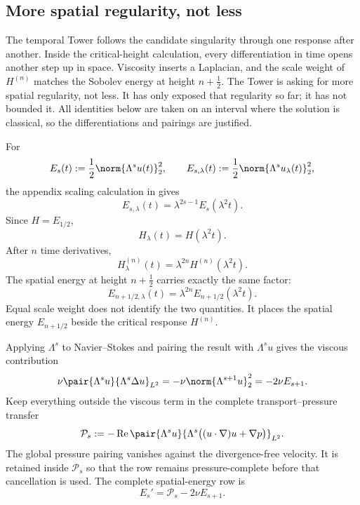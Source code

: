 \subsection{More spatial regularity, not less}\label{sub:ThePressureCompleteMixedDerivativeTower}

The temporal Tower follows the candidate singularity through one response after another.
Inside the critical-height calculation, every differentiation in time opens another step up in space.
Viscosity inserts a Laplacian, and the scale weight of \(H^{(n)}\) matches the Sobolev energy at height \(n+\tfrac12\).
The Tower is asking for more spatial regularity, not less.
It has only exposed that regularity so far; it has not bounded it.
All identities below are taken on an interval where the solution is classical, so the differentiations and pairings are justified.

For
\[
  E_s(t):=\frac12\norm{\Lambda^su(t)}_2^2,
  \qquad
  E_{s,\lambda}(t):=\frac12\norm{\Lambda^su_\lambda(t)}_2^2,
\]
the appendix scaling calculation in  gives
\begin{equation}\label{eq:BodySpatialEnergyScaling}
  E_{s,\lambda}(t)
  =\lambda^{2s-1}E_s(\lambda^2t).
\end{equation}
Since \(H=E_{1/2}\),
\[
  H_\lambda(t)=H(\lambda^2t).
\]
After \(n\) time derivatives,
\begin{equation}\label{eq:BodyCriticalHeightTemporalScaling}
  H_\lambda^{(n)}(t)
  =\lambda^{2n}H^{(n)}(\lambda^2t).
\end{equation}
The spatial energy at height \(n+\tfrac12\) carries exactly the same factor:
\begin{equation}\label{eq:BodySpatialHeightScalingDiagonal}
  E_{n+1/2,\lambda}(t)
  =\lambda^{2n}E_{n+1/2}(\lambda^2t).
\end{equation}
Equal scale weight does not identify the two quantities.
It places the spatial energy \(E_{n+1/2}\) beside the critical response \(H^{(n)}\).

Applying \(\Lambda^s\) to Navier--Stokes and pairing the result with \(\Lambda^su\) gives the viscous contribution
\[
  \nu\pair{\Lambda^su}{\Lambda^s\Delta u}_{L^2}
  =-\nu\norm{\Lambda^{s+1}u}_2^2
  =-2\nu E_{s+1}.
\]
Keep everything outside the viscous term in the complete transport--pressure transfer
\[
  \mathcal P_s
  :=-
  \operatorname{Re}
  \pair{\Lambda^su}
  {\Lambda^s\bigl((u\cdot\nabla)u+\nabla p\bigr)}_{L^2}.
\]
The global pressure pairing vanishes against the divergence-free velocity.
It is retained inside \(\mathcal P_s\) so that the row remains pressure-complete before that cancellation is used.
The complete spatial-energy row is
\begin{equation}\label{eq:BodyCriticalEnergyBalance}
  E_s'=\mathcal P_s-2\nu E_{s+1}.
\end{equation}

